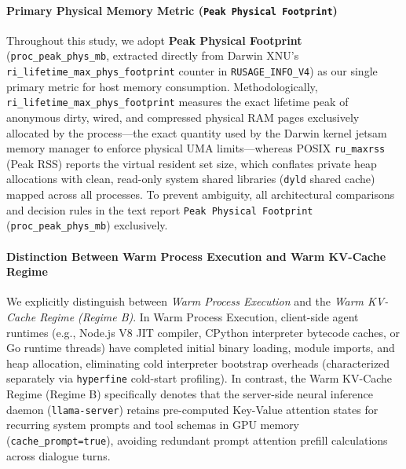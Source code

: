 \documentclass[preprint,12pt,3p]{elsarticle}
\begin{document}
\paragraph{Primary Physical Memory Metric (\texttt{Peak Physical Footprint})}
Throughout this study, we adopt \textbf{Peak Physical Footprint} (\texttt{proc\_peak\_phys\_mb}, extracted directly from Darwin XNU's \texttt{ri\_lifetime\_max\_phys\_footprint} counter in \texttt{RUSAGE\_INFO\_V4}) as our single primary metric for host memory consumption. Methodologically, \texttt{ri\_lifetime\_max\_phys\_footprint} measures the exact lifetime peak of anonymous dirty, wired, and compressed physical RAM pages exclusively allocated by the process—the exact quantity used by the Darwin kernel jetsam memory manager to enforce physical UMA limits—whereas POSIX \texttt{ru\_maxrss} (Peak RSS) reports the virtual resident set size, which conflates private heap allocations with clean, read-only system shared libraries (\texttt{dyld} shared cache) mapped across all processes. To prevent ambiguity, all architectural comparisons and decision rules in the text report \texttt{Peak Physical Footprint} (\texttt{proc\_peak\_phys\_mb}) exclusively.

\paragraph{Distinction Between Warm Process Execution and Warm KV-Cache Regime}
We explicitly distinguish between \textit{Warm Process Execution} and the \textit{Warm KV-Cache Regime (Regime B)}. In Warm Process Execution, client-side agent runtimes (e.g., Node.js V8 JIT compiler, CPython interpreter bytecode caches, or Go runtime threads) have completed initial binary loading, module imports, and heap allocation, eliminating cold interpreter bootstrap overheads (characterized separately via \texttt{hyperfine} cold-start profiling). In contrast, the Warm KV-Cache Regime (Regime B) specifically denotes that the server-side neural inference daemon (\texttt{llama-server}) retains pre-computed Key-Value attention states for recurring system prompts and tool schemas in GPU memory (\texttt{cache\_prompt=true}), avoiding redundant prompt attention prefill calculations across dialogue turns.
\end{document}

